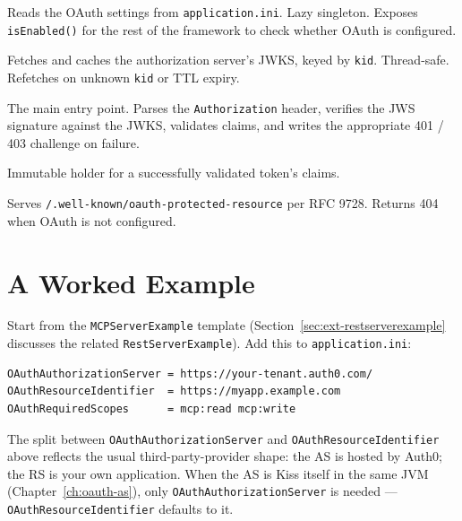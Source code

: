 \begin{description}[style=nextline]
  \item[\texttt{OAuthConfig}\index{OAuthConfig}] Reads the OAuth settings from \texttt{application.ini}.  Lazy singleton.  Exposes \texttt{isEnabled()} for the rest of the framework to check whether OAuth is configured.
  \item[\texttt{JwksCache}\index{JwksCache}] Fetches and caches the authorization server's JWKS, keyed by \texttt{kid}.  Thread-safe.  Refetches on unknown \texttt{kid} or TTL expiry.
  \item[\texttt{BearerTokenValidator}\index{BearerTokenValidator}] The main entry point.  Parses the \texttt{Authorization} header, verifies the JWS signature against the JWKS, validates claims, and writes the appropriate 401 / 403 challenge on failure.
  \item[\texttt{ValidatedToken}\index{ValidatedToken}] Immutable holder for a successfully validated token's claims.
  \item[\texttt{ProtectedResourceMetadataServlet}\index{ProtectedResourceMetadataServlet@Protected\-Resource\-Metadata\-Servlet}] Serves \texttt{/.well-known/oauth-protected-resource} per RFC 9728.  Returns 404 when OAuth is not configured.
\end{description}

\section{A Worked Example}
\label{sec:oauth-example}

Start from the \texttt{MCPServer\-Example} template (Section~\ref{sec:ext-restserverexample} discusses the related \texttt{RestServer\-Example}).  Add this to \texttt{application.ini}:

\begin{lstlisting}[style=ini]
OAuthAuthorizationServer = https://your-tenant.auth0.com/
OAuthResourceIdentifier  = https://myapp.example.com
OAuthRequiredScopes      = mcp:read mcp:write
\end{lstlisting}

\noindent
The split between \texttt{OAuthAuthorizationServer} and \texttt{OAuthResource\-Identifier} above reflects the usual third-party-provider shape: the AS is hosted by Auth0; the RS is your own application.  When the AS is Kiss itself in the same JVM (Chapter~\ref{ch:oauth-as}), only \texttt{OAuthAuthorizationServer} is needed --- \texttt{OAuthResource\-Identifier} defaults to it.


